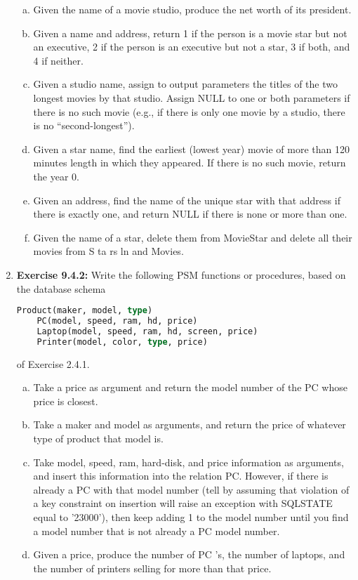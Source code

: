 \documentclass[12pt]{article}
\begin{document}
\begin{enumerate}[1.]
    \begin{enumerate}[a)]
        \item Given the name of a movie studio, produce the net worth of its president.
        \item Given a name and address, return 1 if the person is a movie star but not an executive, 2 if the person is an executive but not a star, 3 if both, and 4 if neither.
        \item Given a studio name, assign to output parameters the titles of the two longest movies by that studio. Assign NULL to one or both parameters if there is no such movie (e.g., if there is only one movie by a studio, there is no “second-longest”).
        \item Given a star name, find the earliest (lowest year) movie of more than 120 minutes length in which they appeared. If there is no such movie, return the year 0.
        \item Given an address, find the name of the unique star with that address if there is exactly one, and return NULL if there is none or more than one.
        \item Given the name of a star, delete them from MovieStar and delete all their movies from S ta rs ln and Movies.
    \end{enumerate}

    \item \textbf{Exercise 9.4.2:} Write the following PSM functions or procedures,
    based on the database schema

    \bigskip

    \begin{lstlisting}[language=SQL]
    Product(maker, model, type)
    PC(model, speed, ram, hd, price)
    Laptop(model, speed, ram, hd, screen, price)
    Printer(model, color, type, price)
    \end{lstlisting}

    \bigskip

    of Exercise 2.4.1.

    \bigskip

    \begin{enumerate}[a)]
        \item Take a price as argument and return the model number of the PC whose price is closest.
        \item Take a maker and model as arguments, and return the price of whatever type of product that model is.
        \item Take model, speed, ram, hard-disk, and price information as arguments, and insert this information into the relation PC. However, if there is already a PC with that model number (tell by assuming that violation of a key constraint on insertion will raise an exception with SQLSTATE equal to ’23000’), then keep adding 1 to the model number until you find a model number that is not already a PC model number.
        \item Given a price, produce the number of PC ’s, the number of laptops, and the number of printers selling for more than that price.
    \end{enumerate}


\end{enumerate}
\end{document}
